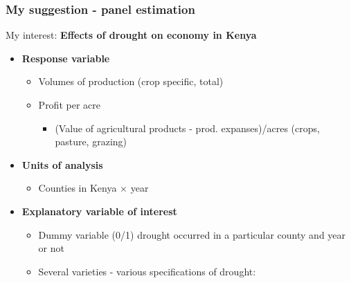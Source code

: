 \documentclass{beamer}              %
\begin{document}
\begin{frame}

\frametitle{My suggestion - panel estimation}\label{MySuggestion1} 

My interest: \textbf{Effects of drought on economy in Kenya}
\begin{itemize}

\item \textbf{Response variable}

\begin{itemize}
\item Volumes of production (crop specific, total)
\item Profit per acre \normalsize{\citep{Deschenes2007Ric}}

\begin{itemize}
\item \footnotesize{(Value of agricultural products - prod. expanses)/acres (crops, pasture, grazing)}\\ 
\end{itemize}
\end{itemize}
\item \textbf{Units of analysis}
\begin{itemize}
\item Counties in Kenya $\times$ year
\
\end{itemize}


\item \textbf{Explanatory variable of interest}

\begin{itemize}
\item Dummy variable (0/1) drought occurred in a particular county and year or not
\item Several varieties - various specifications of drought:

\end{itemize}


\end{itemize}

\end{frame}






\end{document}
